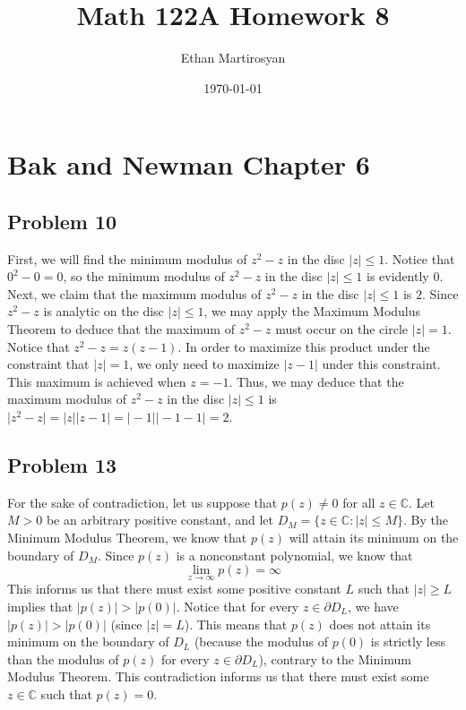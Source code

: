 \documentclass[12pt]{article}
\begin{document}
 
\title{Math 122A Homework 8}
\author{Ethan Martirosyan}
\date{\today}
\maketitle
{}
\hfuzz=50pt
\section*{Bak and Newman Chapter 6}
\subsection*{Problem 10}
First, we will find the minimum modulus of $z^2 - z$ in the disc $\vert z \vert \leq 1$. Notice that $0^2 - 0 = 0$, so the minimum modulus of $z^2 - z$ in the disc $\vert z \vert \leq 1$ is evidently $0$. Next, we claim that the maximum modulus of $z^2 - z$ in the disc $\vert z \vert \leq 1$ is $2$. Since $z^2 - z$ is analytic on the disc $\vert z \vert \leq 1$, we may apply the Maximum Modulus Theorem to deduce that the maximum of $z^2 - z$ must occur on the circle $\vert z \vert = 1$. Notice that $z^2 - z = z(z-1)$. In order to maximize this product under the constraint that $\vert z \vert = 1$, we only need to maximize $\vert z - 1 \vert$ under this constraint. This maximum is achieved when $z = -1$. Thus, we may deduce that the maximum modulus of $z^2 - z$ in the disc $\vert z \vert \leq 1$ is $\vert z^2 - z \vert = \vert z \vert \vert z - 1 \vert = \vert  -1 \vert \vert -1 - 1 \vert = 2$.
\newpage
\subsection*{Problem 13}
For the sake of contradiction, let us suppose that $p(z) \neq 0$ for all $z \in \mathbb{C}$. Let $M > 0$ be an arbitrary positive constant, and let $D_M = \{z \in \mathbb{C}: \vert z \vert \leq M\}$. By the Minimum Modulus Theorem, we know that $p(z)$ will attain its minimum on the boundary of $D_M$. Since $p(z)$ is a nonconstant polynomial, we know that 
\[
\lim_{z \rightarrow \infty} p(z) = \infty
\] This informs us that there must exist some positive constant $L$ such that $\vert z \vert \geq L$ implies that $\vert p(z) \vert > \vert p(0) \vert$. Notice that for every $z \in \partial{D_L}$, we have $\vert p(z) \vert > \vert p(0) \vert$ (since $\vert z \vert = L$). This means that $p(z)$ does not attain its minimum on the boundary of $D_L$ (because the modulus of $p(0)$ is strictly less than the modulus of $p(z)$ for every $z \in \partial{D_L}$), contrary to the Minimum Modulus Theorem. This contradiction informs us that there must exist some $z \in \mathbb{C}$ such that $p(z) = 0$.
 \newpage
\end{document}
